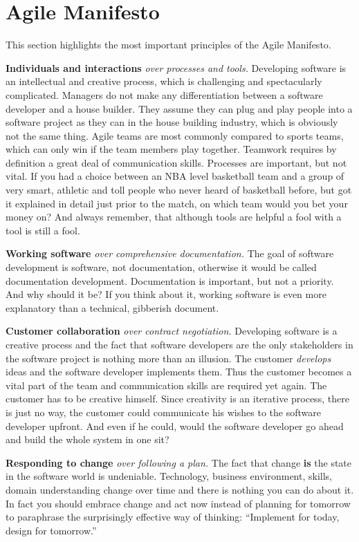 \section{Agile Manifesto}
This section highlights the most important principles of the Agile
Manifesto.

{\bf Individuals and interactions} \emph{over processes and tools.} Developing
software is an intellectual and creative process, which is challenging and spectacularly
complicated. Managers do not make any differentiation between a software
developer and a house builder. They assume they can plug and play people into a
software project as they can in the house building industry, which is obviously
not the same thing. Agile teams are most commonly compared to
sports teams, which can only win if the team members play together. Teamwork
requires by definition a great deal of communication skills. Processes are
important, but not vital. If you had a choice between an NBA level basketball
team and a group of very smart, athletic and toll people who never heard of
basketball before, but got it explained in detail just prior to the match, on
which team would you bet your money on? And always remember, that although tools
are helpful a fool with a tool is still a fool.

{\bf Working software} \emph{over comprehensive documentation.} The goal of
software development is software, not documentation, otherwise it would be called
documentation development.\cite{Ambler200204} Documentation is important, but
not a priority. And why should it be? If you think about it, working software is
even more explanatory than a technical, gibberish document.

{\bf Customer collaboration} \emph{over contract negotiation.} Developing software is a
creative process and the fact that software developers are the only stakeholders
in the software project is nothing more than an illusion. The customer
\emph{develops} ideas and the software developer implements them. Thus the
customer becomes a vital part of the team and communication skills are required
yet again. The customer has to be creative himself. Since creativity is an
iterative process, there is just no way, the customer could communicate his
wishes to the software developer upfront. And even if he could, would the
software developer go ahead and build the whole system in one sit?

{\bf Responding to change} \emph{over following a plan.} The fact that change {\bf is}
the state in the software world is undeniable. Technology, business environment,
skills, domain understanding change over time and there is nothing you can do
about it. In fact you should embrace change and act now instead of planning for
tomorrow to paraphrase the surprisingly effective way of thinking:
\enquote{Implement for today, design for tomorrow.}\cite{BeckAndres200411}

